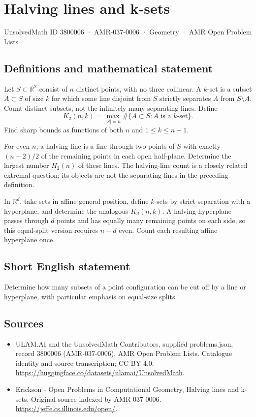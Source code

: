 \documentclass[11pt,a4paper]{article}
\begin{document}
\section*{Halving lines and k-sets}\label{3800006}
{\small UnsolvedMath ID 3800006 · AMR-037-0006 · Geometry · AMR Open Problem Lists}
\subsection{Definitions and mathematical statement}
Let $S\subset\mathbb R^2$ consist of $n$ distinct points, with no three
collinear. A $k$-set is a subset $A\subset S$ of size $k$ for which some
line disjoint from $S$ strictly separates $A$ from $S\setminus A$.
Count distinct subsets, not the infinitely many separating lines. Define
\[
 K_2(n,k)=\max_{|S|=n}\#\{A\subset S:A\text{ is a }k\text{-set}\}.
\]
Find sharp bounds as functions of both $n$ and $1\le k\le n-1$.

For even $n$, a halving line is a line through two points of $S$ with
exactly $(n-2)/2$ of the remaining points in each open half-plane. Determine
the largest number $H_2(n)$ of these lines. The halving-line count is a
closely related extremal question; its objects are not the separating
lines in the preceding definition.

In $\mathbb R^d$, take sets in affine general position, define $k$-sets by
strict separation with a hyperplane, and determine the analogous
$K_d(n,k)$. A halving hyperplane passes through $d$ points and has equally
many remaining points on each side, so this equal-split version requires
$n-d$ even. Count each resulting affine hyperplane once.
\subsection{Short English statement}
Determine how many subsets of a point configuration can be cut off by
a line or hyperplane, with particular emphasis on equal-size splits.
\subsection{Sources}
\begin{itemize}
\item[S1] ULAM.AI and the UnsolvedMath Contributors, supplied problems.json, record 3800006 (AMR-037-0006), AMR Open Problem Lists. Catalogue identity and source transcription; CC BY 4.0.
\url{https://huggingface.co/datasets/ulamai/UnsolvedMath}.
\item[S2] Erickson - Open Problems in Computational Geometry, Halving lines and k-sets. Original source indexed by AMR-037-0006.
\url{https://jeffe.cs.illinois.edu/open/}.
\end{itemize}
\end{document}

